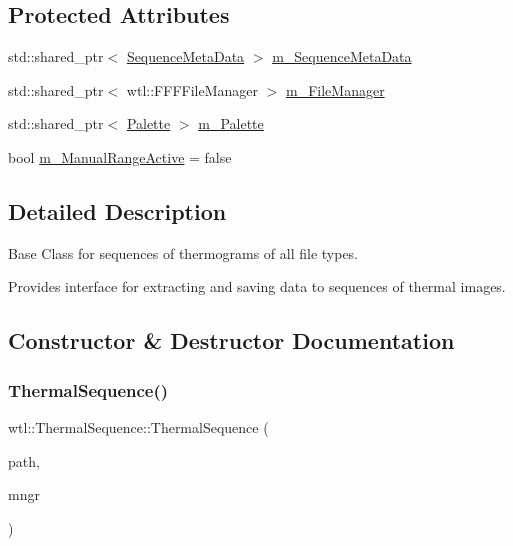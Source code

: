 \subsection*{Protected Attributes}
\begin{DoxyCompactItemize}
\item 
std\+::shared\+\_\+ptr$<$ \hyperlink{classwtl_1_1_sequence_meta_data}{Sequence\+Meta\+Data} $>$ \hyperlink{classwtl_1_1_thermal_sequence_a34961af460960c62b77a2d11fd49e2d3}{m\+\_\+\+Sequence\+Meta\+Data}
\item 
std\+::shared\+\_\+ptr$<$ wtl\+::\+F\+F\+F\+File\+Manager $>$ \hyperlink{classwtl_1_1_thermal_sequence_a8b3a995d93dad09344825622df9f418b}{m\+\_\+\+File\+Manager}
\item 
std\+::shared\+\_\+ptr$<$ \hyperlink{classwtl_1_1_palette}{Palette} $>$ \hyperlink{classwtl_1_1_thermal_sequence_a513c59e37dca388f0f68cbb24e527aa9}{m\+\_\+\+Palette}
\item 
bool \hyperlink{classwtl_1_1_thermal_sequence_a9af26492b66fcd91aecb62aaf1508a8f}{m\+\_\+\+Manual\+Range\+Active} = false
\end{DoxyCompactItemize}


\subsection{Detailed Description}
Base Class for sequences of thermograms of all file types. 

Provides interface for extracting and saving data to sequences of thermal images. 

\subsection{Constructor \& Destructor Documentation}
\mbox{\label{classwtl_1_1_thermal_sequence_a222d1dcbb659a83cff8f60a431f8a370}} 
\subsubsection{\texorpdfstring{Thermal\+Sequence()}{ThermalSequence()}\hspace{0.1cm}{\footnotesize\ttfamily [1/3]}}
{\footnotesize\ttfamily wtl\+::\+Thermal\+Sequence\+::\+Thermal\+Sequence (\begin{DoxyParamCaption}\item[{const std\+::string \&}]{path,  }\item[{std\+::shared\+\_\+ptr$<$ wtl\+::\+F\+F\+F\+File\+Manager $>$}]{mngr }\end{DoxyParamCaption})\hspace{0.3cm}{\ttfamily [protected]}}



